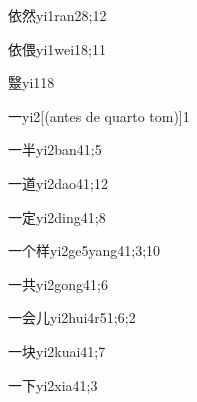 \begin{verbete}{依然}{yi1ran2}{8;12}
\end{verbete}

\begin{verbete}{依偎}{yi1wei1}{8;11}
\end{verbete}

\begin{verbete}{毉}{yi1}{18}
\end{verbete}

\begin{verbete}{一}{yi2}[(antes de quarto tom)]{1}
\end{verbete}

\begin{verbete}{一半}{yi2ban4}{1;5}
\end{verbete}

\begin{verbete}{一道}{yi2dao4}{1;12}
\end{verbete}

\begin{verbete}{一定}{yi2ding4}{1;8}
\end{verbete}

\begin{verbete}{一个样}{yi2ge5yang4}{1;3;10}
\end{verbete}

\begin{verbete}{一共}{yi2gong4}{1;6}
\end{verbete}

\begin{verbete}{一会儿}{yi2hui4r5}{1;6;2}
\end{verbete}

\begin{verbete}{一块}{yi2kuai4}{1;7}
\end{verbete}

\begin{verbete}{一下}{yi2xia4}{1;3}
\end{verbete}

